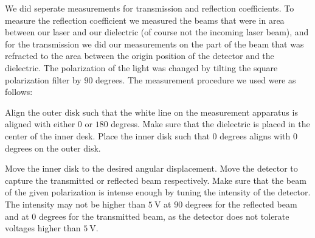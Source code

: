 We did seperate measurements for transmission and reflection coefficients. To measure the reflection coefficient we measured the beams that were in area between our laser and our dielectric (of course not the incoming laser beam), and for the transmission we did our measurements on the part of the beam that was refracted to the area between the origin position of the detector and the dielectric. The polarization of the light was changed by tilting the square polarization filter by $90$ degrees. The measurement procedure we used were as follows:

Align the outer disk such that the white line on the measurement apparatus is aligned with either $0$ or $180$ degress. Make sure that the dielectric is placed in the center of the inner desk. Place the inner disk such that $0$ degrees aligns with $0$ degrees on the outer disk.

Move the inner disk to the desired angular displacement. Move the detector to capture the transmitted or reflected beam respectively. Make sure that the beam of the given polarization is intense enough by tuning the intensity of the detector. The intensity may not be higher than $\SI{5}{\volt}$ at $90$ degrees for the reflected beam and at $0$ degrees for the transmitted beam, as the detector does not tolerate voltages higher than $\SI{5}{\volt}$. 
